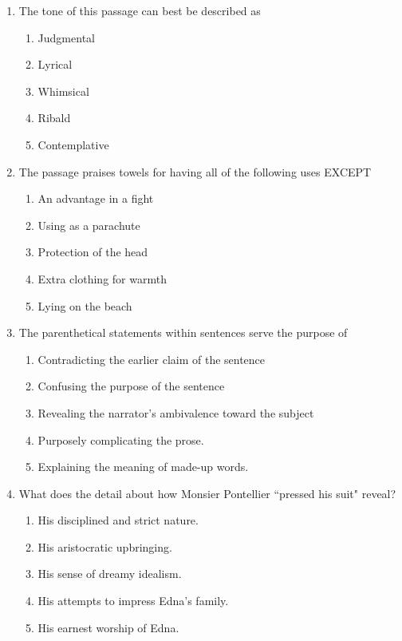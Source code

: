 \documentclass[12pt]{book}
\begin{document}
\bigskip
\begin{enumerate}
\item The tone of this passage can best be described as 

\begin{enumerate}[label=(\Alph*)]
\item Judgmental
\item Lyrical
\item Whimsical
\item Ribald
\item Contemplative
\end{enumerate}

\bigskip
\item The passage praises towels for having all of the following uses EXCEPT
\begin{enumerate}[label=(\Alph*)]
\item An advantage in a fight
\item Using as a parachute
\item Protection of the head
\item Extra clothing for warmth
\item Lying on the beach
\end{enumerate}

\newpage
\item The parenthetical statements within sentences serve the purpose of
\begin{enumerate}[label=(\Alph*)]
\item Contradicting the earlier claim of the sentence
\item Confusing the purpose of the sentence
\item Revealing the narrator's ambivalence toward the subject
\item Purposely complicating the prose.
\item Explaining the meaning of made-up words.
\end{enumerate}

\bigskip
\item What does the detail about how Monsier Pontellier ``pressed his suit" reveal?
\begin{enumerate}[label=(\Alph*)]
\item His disciplined and strict nature.
\item His aristocratic upbringing.
\item His sense of dreamy idealism.
\item His attempts to impress Edna's family.
\item His earnest worship of Edna.
\end{enumerate}
\end{enumerate}
\end{document}
